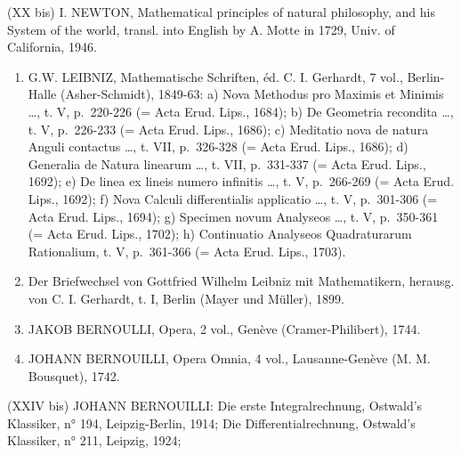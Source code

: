 (XX bis) I. NEWTON, Mathematical principles of natural philosophy, and his System of the world, transl. into English by A. Motte in 1729, Univ. of California, 1946.

\begin{enumerate}
\def\labelenumi{(\Roman{enumi})}
\setcounter{enumi}{20}
\item
  G.W. LEIBNIZ, Mathematische Schriften, éd. C. I. Gerhardt, 7 vol., Berlin-Halle (Asher-Schmidt), 1849-63: a) Nova Methodus pro Maximis et Minimis \ldots, t. V, p.~220-226 (= Acta Erud. Lips., 1684); b) De Geometria recondita \ldots, t. V, p.~226-233 (= Acta Erud. Lips., 1686); c) Meditatio nova de natura Anguli contactus \ldots, t. VII, p.~326-328 (= Acta Erud. Lips., 1686); d) Generalia de Natura linearum \ldots, t. VII, p.~331-337 (= Acta Erud. Lips., 1692); e) De linea ex lineis numero infinitis \ldots, t. V, p.~266-269 (= Acta Erud. Lips., 1692); f) Nova Calculi differentialis applicatio \ldots, t. V, p.~301-306 (= Acta Erud. Lips., 1694); g) Specimen novum Analyseos \ldots, t. V, p.~350-361 (= Acta Erud. Lips., 1702); h) Continuatio Analyseos Quadraturarum Rationalium, t. V, p.~361-366 (= Acta Erud. Lips., 1703).
\item
  Der Briefwechsel von Gottfried Wilhelm Leibniz mit Mathematikern, herausg. von C. I. Gerhardt, t. I, Berlin (Mayer und Müller), 1899.
\item
  JAKOB BERNOULLI, Opera, 2 vol., Genève (Cramer-Philibert), 1744.
\item
  JOHANN BERNOUILLI, Opera Omnia, 4 vol., Lausanne-Genève (M. M. Bousquet), 1742.
\end{enumerate}

(XXIV bis) JOHANN BERNOUILLI: Die erste Integralrechnung, Ostwald's Klassiker, n° 194, Leipzig-Berlin, 1914; Die Differentialrechnung, Ostwald's Klassiker, n° 211, Leipzig, 1924;


